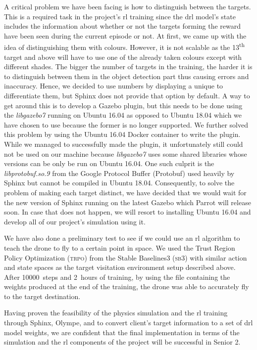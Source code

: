 \documentclass[../main.tex]{subfiles}
\begin{document}
A critical problem we have been facing 
is how to distinguish
between the targets. This is a required task in the
project's \gls{rl} training since 
the \gls{drl} model's state
includes the information about whether or not
the targets forming the reward have been seen 
during the current episode or not. 
At first, we came up with the idea of distinguishing them
with colours. However, it is not scalable 
as the 13\textsuperscript{th}
target and above will have to use 
one of the already taken colours
except with different shades. The bigger the number of
targets in the training, the harder it is to
distinguish between them in the object detection part
thus causing errors and inaccuracy. Hence, we decided
to use numbers by displaying a unique \id
to differentiate them, but
Sphinx does not provide that option by default.
A way to get around this is to develop a Gazebo plugin,
but this needs to be done using the \textit{libgazebo7} running
on Ubuntu 16.04 as opposed to Ubuntu 18.04 which we 
have chosen to use because the former 
is no longer supported.
We further solved this problem by using the Ubuntu 16.04
Docker container to write the plugin. While we managed
to successfully made the plugin, it unfortunately still
could not be used on our machine because \textit{libgazebo7}
uses some shared libraries whose versions can be only 
be run on Ubuntu 16.04. One such culprit is the 
\textit{libprotobuf.so.9} from the Google Protocol Buffer 
(Protobuf) used heavily by Sphinx but cannot be compiled
in Ubuntu 18.04. Consequently, 
to solve the problem of making each target distinct, 
we have decided that we would wait for the new
version of Sphinx running on the latest Gazebo
which Parrot will release soon. In case that does
not happen,
we will resort to installing Ubuntu 16.04 and develop
all of our project's simulation using it.

We have also done a preliminary test to see if
we could use an \gls{rl} algorithm
to teach the \anafi drone to fly to a certain
point in space. We used the Trust Region Policy
Optimization (\textsc{trpo}) from the Stable
Baselines3 (\textsc{sb}3) with similar action
and state spaces as the target visitation environment
setup described above.
After \SI{10000}{steps} and \SI{2}{hours}
of training, by using the file containing the weights 
produced at the end of the training,
the drone was able to accurately
fly to the target destination. 

Having proven the feasibility of the physics simulation
and the \gls{rl} training through Sphinx, Olympe, and \gym
to convert client's target information to
a set of \gls{drl} model weights, 
we are confident that the final implementation 
in terms of the simulation and the \gls{rl} components
of the project will be successful in Senior 2.
\end{document}
